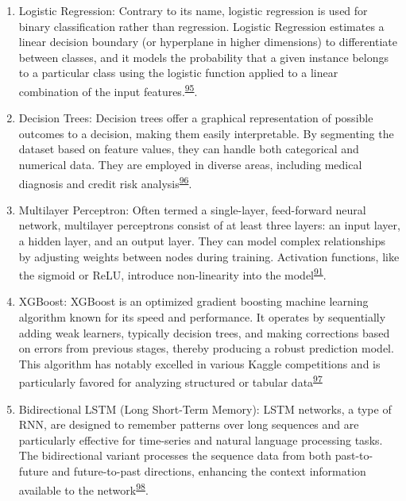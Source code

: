 \documentclass[
  10pt,
]{scrbook}
\begin{document}
\begin{enumerate}
\def\labelenumi{\arabic{enumi}.}
\item
  Logistic Regression: Contrary to its name, logistic regression is used
  for binary classification rather than regression. Logistic Regression
  estimates a linear decision boundary (or hyperplane in higher
  dimensions) to differentiate between classes, and it models the
  probability that a given instance belongs to a particular class using
  the logistic function applied to a linear combination of the input
  features.\textsuperscript{\protect\hyperlink{ref-McCullagh_1989}{95}}.
\item
  Decision Trees: Decision trees offer a graphical representation of
  possible outcomes to a decision, making them easily interpretable. By
  segmenting the dataset based on feature values, they can handle both
  categorical and numerical data. They are employed in diverse areas,
  including medical diagnosis and credit risk
  analysis\textsuperscript{\protect\hyperlink{ref-quinlan_1986}{96}}.
\item
  Multilayer Perceptron: Often termed a single-layer, feed-forward
  neural network, multilayer perceptrons consist of at least three
  layers: an input layer, a hidden layer, and an output layer. They can
  model complex relationships by adjusting weights between nodes during
  training. Activation functions, like the sigmoid or ReLU, introduce
  non-linearity into the
  model\textsuperscript{\protect\hyperlink{ref-Goodfellow-et-al-2016}{91}}.
\item
  XGBoost: XGBoost is an optimized gradient boosting machine learning
  algorithm known for its speed and performance. It operates by
  sequentially adding weak learners, typically decision trees, and
  making corrections based on errors from previous stages, thereby
  producing a robust prediction model. This algorithm has notably
  excelled in various Kaggle competitions and is particularly favored
  for analyzing structured or tabular
  data\textsuperscript{\protect\hyperlink{ref-Chen_xgboost_2016}{97}}
\item
  Bidirectional LSTM (Long Short-Term Memory): LSTM networks, a type of
  RNN, are designed to remember patterns over long sequences and are
  particularly effective for time-series and natural language processing
  tasks. The bidirectional variant processes the sequence data from both
  past-to-future and future-to-past directions, enhancing the context
  information available to the
  network\textsuperscript{\protect\hyperlink{ref-graves_2005}{98}}.
\end{enumerate}
\end{document}

